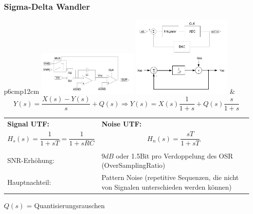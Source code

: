 \subsubsection{Sigma-Delta Wandler }
  \begin{longtable}{p{6cm}p{12cm}}
    \includegraphics[width=5cm, valign=t]{pictures/deltaSigma1} \newline 
    \includegraphics[width=5cm]{pictures/deltaSigma3} &
    \[Y(s)=\frac{X(s)-Y(s)}{s}+Q(s)\Rightarrow Y(s)=X(s)\frac{1}{1+s}+Q(s)\frac{s}{1+s}\] \newline
    \begin{tabular}{p{5cm}p{7cm}}
      \textbf{Signal UTF:} &
      \textbf{Noise UTF:} \\
      
      \[ H_s(s) = \frac{1}{1+sT} = \frac{1}{1+sRC} \] &    
      \[ H_n(s) = \frac{sT}{1+sT} \] \\ \\
      
      SNR-Erhöhung: &
      $9dB$ oder 1.5Bit pro Verdoppelung des OSR (OverSamplingRatio) \\
      Hauptnachteil: &
      Pattern Noise (repetitive Sequenzen, die nicht von Signalen unterschieden werden können)
    \end{tabular}
    $Q(s)$ = Quantisierungsrauschen
    
  \end{longtable}

